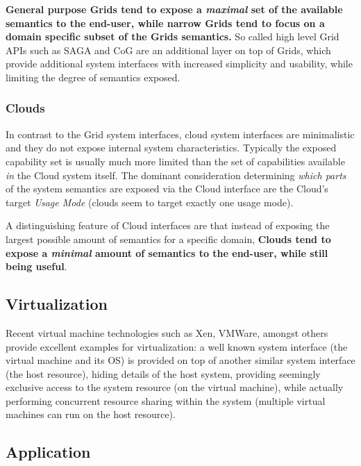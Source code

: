 \documentclass[conference,final]{IEEEtran}
\newcommand{\I}[1]{\textit{#1}}
\newcommand{\B}[1]{\textbf{#1}}
\begin{document}
   \B{General purpose Grids tend to expose a \I{maximal} set of the
   available semantics to the end-user, while narrow Grids tend to
   focus on a domain specific subset of the Grids semantics.}  So
   called high level Grid APIs such as SAGA and CoG are an additional
   layer on top of Grids, which provide additional system interfaces
   with increased simplicity and usability, while limiting the degree
   of semantics exposed.


  \subsubsection{Clouds}


  In contrast to the Grid system interfaces, cloud system interfaces
  are minimalistic and they do not expose internal system
  characteristics. Typically the exposed capability set is usually
  much more limited than the set of capabilities available \I{in} the
  Cloud system itself.  The dominant consideration determining
  \I{which parts} of the system semantics are exposed via the Cloud
  interface are the Cloud's target \I{Usage Mode} (clouds seem to
  target exactly one usage mode).

   A distinguishing feature of Cloud interfaces are that instead of
   exposing the largest possible amount of semantics for a specific
   domain, \B{Clouds tend to expose a \I{minimal} amount of semantics
   to the end-user, while still being useful}.


 \subsection{Virtualization}

  Recent virtual machine technologies such as Xen, VMWare, amongst
  others provide excellent examples for virtualization: a well known
  system interface (the virtual machine and its OS) is provided on top
  of another similar system interface (the host resource), hiding
  details of the host system, providing seemingly exclusive access to
  the system resource (on the virtual machine), while actually
  performing concurrent resource sharing within the system (multiple
  virtual machines can run on the host resource).
 

 \subsection{Application}
\end{document}
